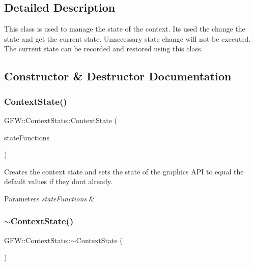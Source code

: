 \subsection{Detailed Description}
This class is used to manage the state of the context. It\textquotesingle{}s used the change the state and get the current state. Unnecessary state change will not be executed. The current state can be recorded and restored using this class. 

\subsection{Constructor \& Destructor Documentation}
\mbox{\label{class_g_f_w_1_1_context_state_ad459179ac46661f8cc69e1394e4bb37a}} 
\subsubsection{\texorpdfstring{Context\+State()}{ContextState()}}
{\footnotesize\ttfamily G\+F\+W\+::\+Context\+State\+::\+Context\+State (\begin{DoxyParamCaption}\item[{\hyperlink{class_g_f_w_1_1_i_context_state_functions}{I\+Context\+State\+Functions} $\ast$}]{state\+Functions }\end{DoxyParamCaption})}



Creates the context state and sets the state of the graphics A\+PI to equal the default values if they don\textquotesingle{}t already. 


\begin{DoxyParams}{Parameters}
{\em state\+Functions} & \\
\hline
\end{DoxyParams}
\mbox{\label{class_g_f_w_1_1_context_state_ae40d89f70977fbbcd5da8cab7ca4458a}} 
\subsubsection{\texorpdfstring{$\sim$\+Context\+State()}{~ContextState()}}
{\footnotesize\ttfamily G\+F\+W\+::\+Context\+State\+::$\sim$\+Context\+State (\begin{DoxyParamCaption}{ }\end{DoxyParamCaption})}



